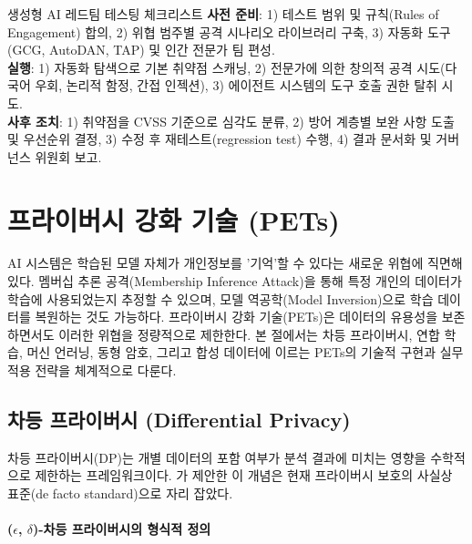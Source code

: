 \begin{practicaltool}{생성형 AI 레드팀 테스팅 체크리스트}
\textbf{사전 준비}: 1) 테스트 범위 및 규칙(Rules of Engagement) 합의, 2) 위협 범주별 공격 시나리오 라이브러리 구축, 3) 자동화 도구(GCG, AutoDAN, TAP) 및 인간 전문가 팀 편성.\\
\textbf{실행}: 1) 자동화 탐색으로 기본 취약점 스캐닝, 2) 전문가에 의한 창의적 공격 시도(다국어 우회, 논리적 함정, 간접 인젝션), 3) 에이전트 시스템의 도구 호출 권한 탈취 시도.\\
\textbf{사후 조치}: 1) 취약점을 CVSS 기준으로 심각도 분류, 2) 방어 계층별 보완 사항 도출 및 우선순위 결정, 3) 수정 후 재테스트(regression test) 수행, 4) 결과 문서화 및 거버넌스 위원회 보고.
\end{practicaltool}


\section{프라이버시 강화 기술 (PETs)}
\label{sec:15.2}

AI 시스템은 학습된 모델 자체가 개인정보를 '기억'할 수 있다는 새로운 위협에 직면해 있다. 멤버십 추론 공격(Membership Inference Attack)을 통해 특정 개인의 데이터가 학습에 사용되었는지 추정할 수 있으며, 모델 역공학(Model Inversion)으로 학습 데이터를 복원하는 것도 가능하다. 프라이버시 강화 기술(PETs)은 데이터의 유용성을 보존하면서도 이러한 위협을 정량적으로 제한한다. 본 절에서는 차등 프라이버시, 연합 학습\cite{kairouz2021advances}, 머신 언러닝, 동형 암호\cite{abadi2016deep}, 그리고 합성 데이터에 이르는 PETs의 기술적 구현과 실무 적용 전략을 체계적으로 다룬다.

\subsection{차등 프라이버시 (Differential Privacy)}
\label{sec:15.2.1}

차등 프라이버시(DP)는 개별 데이터의 포함 여부가 분석 결과에 미치는 영향을 수학적으로 제한하는 프레임워크이다. \cite{dwork2006calibrating}가 제안한 이 개념은 현재 프라이버시 보호의 사실상 표준(de facto standard)으로 자리 잡았다.

\paragraph{($\epsilon$, $\delta$)-차등 프라이버시의 형식적 정의}

